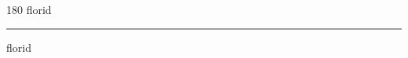 
\begin{frame}
\begin{center}
\begin{turn}{180}
{\fontsize{2.5cm}{1em}\selectfont florid}
\end{turn}
\vspace{1em}\par  
\hrule
\vspace{1em}\par  
{\fontsize{2.5cm}{1em}\selectfont florid}
\end{center}
\end{frame}
